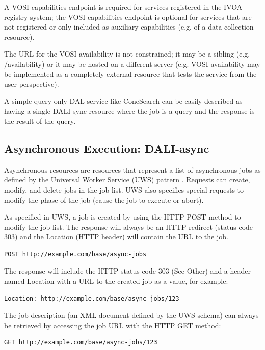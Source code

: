 \documentclass[11pt,letter]{ivoa}
\begin{document}
A VOSI-capabilities endpoint is required for services registered in the IVOA registry system;
the VOSI-capabilities endpoint is optional for services that are not registered
or only included as auxiliary capabilities (e.g. of a data collection resource).

The URL for the VOSI-availability is not constrained; it may be a sibling (e.g. /availability)
or it may be hosted on a different server (e.g. VOSI-availability may be implemented as a
completely external resource that tests the service from the user perspective).

A simple query-only DAL service like ConeSearch can be easily described as
having a single DALI-sync resource where the job is a query and the response is
the result of the query.

\subsection{Asynchronous Execution: DALI-async}
\label{sec:dali-async}
Asynchronous resources are resources that represent a list of asynchronous jobs
as defined by the Universal Worker Service (UWS) pattern \citep{2016ivoa.spec.1024H}.
Requests can
create, modify, and delete jobs in the job list. UWS also specifies special
requests to modify the phase of the job (cause the job to execute or abort).

As specified in UWS, a job is created by using the HTTP POST method to modify
the job list. The response will always be an HTTP redirect (status code 303) and
the Location (HTTP header) will contain the URL to the job.

\begin{verbatim}
POST http://example.com/base/async-jobs
\end{verbatim}

The response will include the HTTP status code 303 (See Other) and a header
named Location with a URL to the created job as a value, for example:

\begin{verbatim}
Location: http://example.com/base/async-jobs/123
\end{verbatim}

The job description (an XML document defined by the UWS schema) can always be
retrieved by accessing the job URL with the HTTP GET method:

\begin{verbatim}
GET http://example.com/base/async-jobs/123
\end{verbatim}
\end{document}
